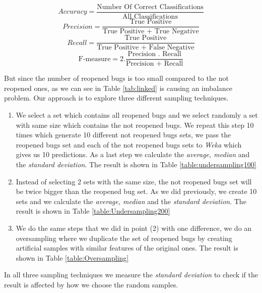 \documentclass[sigconf,review]{acmart}
\begin{document}
\[Accuracy = \frac{\text{Number Of Correct Classifications}}{\text{All Classifications}}\]
\[Precision =  \frac{\text{True Positive}}{\text{True Positive + True Negative}}\]
\[Recall = \frac{\text{True Positive}}{\text{True Positive + False Negative}}\]  
\[\text{F-measure} = 2 . \frac{\text{Precision . Recall}}{\text{Precision + Recall}}\]


But since the number of reopened bugs is too small compared to the not reopened ones, as we can see in Table \ref{tab:linked} is causing an imbalance problem. Our approach is to explore three different sampling techniques.
\begin{enumerate}
\item {We select a set which contains all reopened bugs and we select randomly a set with same size which contains the not reopened bugs. We repeat this step 10 times which generate 10 different not reopened bugs sets, we pass the reopened bugs set and each of the not reopened bugs sets to \emph{Weka} which gives us 10 predictions. As a last step we calculate the \emph{average, median} and the \emph{standard deviation}. The result is shown in Table \ref{table:undersampling100}} 

\item{Instead of selecting 2 sets with the same size, the not reopened bugs set will be twice bigger than the reopened bug set. As we did previously, we create 10 sets and we calculate the \emph{average, median} and the \emph{standard deviation}. The result is shown in Table \ref{table:Undersampling200}}

\item{We do the same steps that we did in point (2) with one difference, we do an oversampling where we duplicate the set of reopened bugs by creating artificial samples with similar features of the original ones. The result is shown in Table \ref{table:Oversampling}} 
\end{enumerate}

In all three sampling techniques we measure the \emph{standard deviation} to check if the result is affected by how we choose the random samples.
\end{document}
